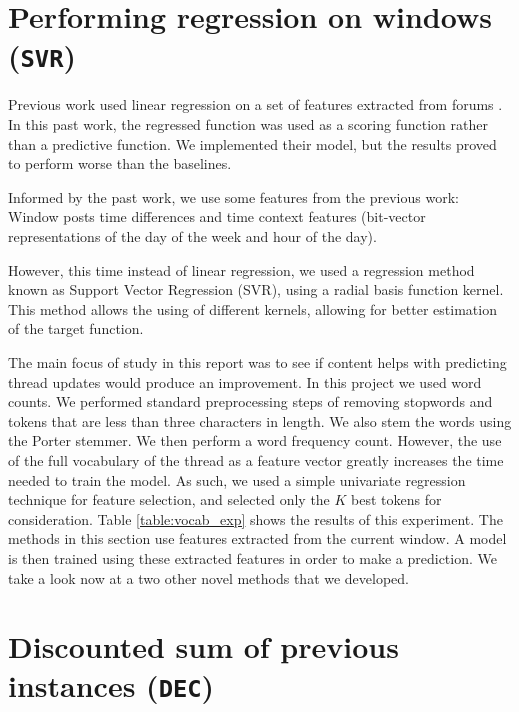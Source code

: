 \section{Performing regression on windows (\texttt{SVR})}
Previous work used linear regression on a set of features extracted from forums 
\cite{Yang2009}. In this past work, the regressed function 
was used as a scoring function rather than a predictive function. We implemented 
their model, but the results proved to perform worse than the baselines.

Informed by the past work, we use some features from the previous work: Window 
posts time differences and time context features (bit-vector representations of 
the day of the week and hour of the day).

However, this time instead of linear regression, we used a regression method 
known as Support Vector Regression (SVR), using a radial basis function kernel.  
This method allows the using of different kernels, allowing for better 
estimation of the target function.

The main focus of study in this report was to see if content helps with 
predicting thread updates would produce an improvement. In this project we used 
word counts. We performed standard preprocessing steps of removing stopwords and 
tokens that are less than three characters in length. We also stem the words 
using the Porter stemmer.
We then perform a word frequency count. However, the use 
of the full vocabulary of the thread as a feature vector greatly increases the 
time needed to train the model.
 As such, we used a simple univariate regression 
technique for feature selection, and selected only the $K$ best tokens for 
consideration. Table \ref{table:vocab_exp} shows the results of this experiment.  
The methods in this section use features extracted from the current window. A 
model is then trained using these extracted features in order to make a 
prediction. We take a look now at a two other novel methods that we developed.

\section{Discounted sum of previous instances (\texttt{DEC})}
 
